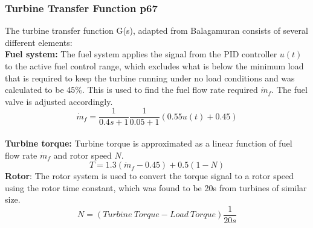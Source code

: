 \subsubsection{Turbine Transfer Function p67}
The turbine transfer function G(s), adapted from Balagamuran \cite{balagamuran} consists of several different elements:
\\\textbf{Fuel system:} The fuel system applies the signal from the PID controller $u(t)$ to the active fuel control range, which excludes what is below the minimum load that is required to keep the turbine running under no load conditions and was calculated to be 45\%. This is used to find the fuel flow rate required $\dot{m}_f$. The fuel valve is adjusted accordingly.
\begin{equation}
\dot{m}_f = \frac{1}{0.4s + 1} \frac{1}{0.05 + 1} (0.55u(t) + 0.45)
\end{equation}
\\\textbf{Turbine torque:} Turbine torque is approximated as a linear function of fuel flow rate $\dot{m}_f$ and rotor speed $N$.
\begin{equation}
T = 1.3(\dot{m}_f - 0.45) + 0.5(1 - N)
\end{equation}
\textbf{Rotor}: The rotor system is used to convert the torque signal to a rotor speed using the rotor time constant, which was found to be 20s from turbines of similar size.
\begin{equation}
N = (Turbine \ Torque - Load \ Torque)\frac{1}{20s}
\end{equation}

